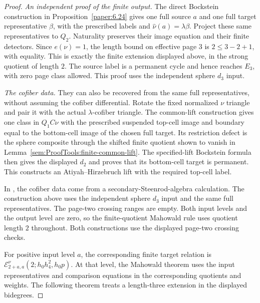 \begin{proof}
\textit{An independent proof of the finite output.} The direct Bockstein
construction in Proposition~\ref{paper:6.24} gives one full source $a$ and
one full target representative $\beta$, with the prescribed labels and
$\widehat\nu(a)=\lambda\beta$. Project these same representatives to
$Q_2$. Naturality preserves their image equation and their finite
detectors. Since $e(\nu)=1$, the length bound on effective page $3$ is
$2\le3-2+1$, with equality. This is exactly the finite extension
displayed above, in the strong quotient of length $2$. The source
label is a permanent cycle and hence reaches $E_3$, with zero page
class allowed. This proof uses the independent sphere $d_3$ input.

\textit{The cofiber data.} They can also be recovered from the same
full representatives, without assuming the cofiber differential.
Rotate the fixed normalized $\nu$ triangle and pair it with the
actual $\lambda$-cofiber triangle. The common-lift construction
gives one class in $Q_1C\nu$ with the prescribed suspended top-cell
image and boundary equal to the bottom-cell image of the chosen
full target. Its restriction defect is the sphere composite through the
shifted finite quotient shown to vanish in
Lemma~\ref{sem:ProofTools:finite-common-lift}. The specified-lift Bockstein formula then
gives the displayed $d_2$ and proves that its bottom-cell target is
permanent. This constructs an Atiyah--Hirzebruch lift with the required top-cell label.

In \cite[Example 6.19]{LWX126}, the cofiber data come from a
secondary-Steenrod-algebra calculation. The construction above uses
the independent sphere $d_3$ input and the same full representatives.
The page-two crossing ranges are empty. Both input levels and the
output level are zero, so the finite-quotient Mahowald rule uses
quotient length $2$ throughout. Both constructions use the displayed page-two crossing checks.

For positive input level $a$, the corresponding finite target relation
is $\mathcal E^\nu_{2+a,a}(2;h_0h_4^2,h_0p)$.
At that level, the Mahowald theorem uses the input representatives
and comparison equations in the corresponding quotients and weights.
The following theorem treats a length-three extension in the displayed bidegrees.
\end{proof}

